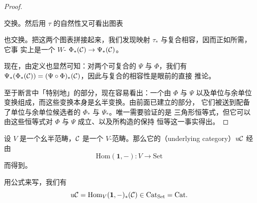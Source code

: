 \begin{proof}
\begin{center}
\end{center}
交换。然后用 $\tau$ 的自然性又可看出图表
\begin{center}
\end{center}
也交换。把这两个图表拼接起来，我们发现映射 $\tau_*$ 与复合相容，因而正如所需，它事
实上是一个 $W$-\trEnrichment{}\trFunctor{} $\Phi_*(\mathcal{C}) \to \Psi_*(\mathcal{C})$。

现在，由定义也显然可知：对两个可复合的\trLaxMonoidalFunctor{} $\Psi$ 与 $\Phi$，我们有
$\Psi_*(\Phi_*(\mathcal{C})) = (\Psi \circ \Phi)_*(\mathcal{C})$，因此与复合的相容性是眼前的直接
推论。

至于断言中「特别地」的部分，现在容易看出：一个\trMonoidalAdjunction{}由\trLaxMonoidalFunctor{} $\Phi$ 与
$\Psi$ 以及单位与余单位变换组成，而这些变换本身是幺半变换。由前面已建立的部分，
它们被送到配备了单位与余单位候选者的\trFunctor{} $\Phi_*$ 与 $\Psi_*$。唯一需要验证的是
三角形恒等式，但它可以由这些恒等式对 $\Phi$ 与 $\Psi$ 成立、以及所构造的\trFunctor{}保持
恒等这一事实得出。
\end{proof}

\begin{definition}\label{def:underlying-category}
设 $V$ 是一个幺半范畴，$\mathcal{C}$ 是一个 $V$-\trEnrichment{}范畴。那么它的\emph{\trUnderlyingCategory{}}（underlying
category）$u\mathcal{C}$ 经由\trLaxMonoidalFunctor{}%
\[
\mathrm{Hom}(\mathbf{1}, -)\colon V \to \mathrm{Set}
\]
而得到。
\end{definition}

用公式来写，我们有
\[
u\mathcal{C} = \mathrm{Hom}_V(\mathbf{1}, -)_*(\mathcal{C}) \in \mathrm{Cat}_{\mathrm{Set}} = \mathrm{Cat}.
\]

